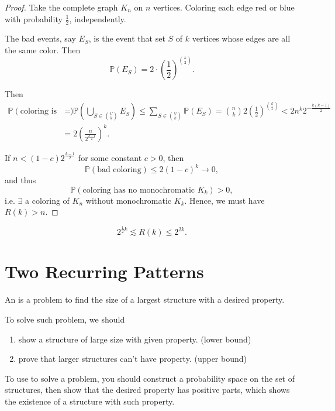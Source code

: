 \begin{proof}
    Take the complete graph \(K_n\) on \(n\) vertices. Coloring each edge red or blue with probability \(\frac{1}{2}\), independently. 

    The bad events, say \(E_S\), is the event that set \(S\) of \(k\) vertices whose edges are all the same color. Then 
    \[
        \mathbb{P} (E_S) = 2 \cdot \left( \frac{1}{2} \right)^{\binom{k}{2}}.
    \]      

    Then 
    \begin{align*}
        \mathbb{P} \left( \text{coloring is bad}  \right) &= \mathbb{P} \left( \bigcup_{S \in \binom{V}{k}} E_S  \right) \le \sum_{S \in \binom{V}{k}} \mathbb{P} (E_S) = \binom{n}{k} 2 \left( \frac{1}{2} \right)^{\binom{k}{2}} < 2 n^k 2^{- \frac{k(k-1)}{2}} \\
        &= 2 \left( \frac{n}{2^{\frac{k-1}{2}}} \right)^k. 
    \end{align*}

    If \(n < (1 - c) 2^{\frac{k-1}{2}}\) for some constant \(c > 0\), then 
    \[
        \mathbb{P} \left( \text{bad coloring}  \right) \le 2(1 - c)^k \to 0,  
    \]  
    and thus 
    \[
        \mathbb{P} \left( \text{coloring has no monochromatic } K_k  \right) > 0, 
    \]
    i.e. \(\exists \) a coloring of \(K_n\) without monochromatic \(K_k\). Hence, we must have \(R(k) > n\).    
\end{proof}

\begin{theorem}\label{thm:ramsey-bounds}
    \[
        2^{\frac{1}{2} k} \lesssim R(k) \le 2^{2k}.
    \]
\end{theorem}

\section{Two Recurring Patterns}\label{sec:patterns}

\begin{definition}
    An  is a problem to find the size of  a largest structure with a desired property.
\end{definition}

To solve such problem, we should 
\begin{enumerate}[(1)]
    \item show a structure of large size with given property. (lower bound)
    \item prove that larger structures can't have property. (upper bound)
\end{enumerate}

\begin{definition}
    To use  to solve a problem, you should construct a probability space on the set of structures, then show that the desired property has positive parts, which shows the existence of a structure with such property.
\end{definition}